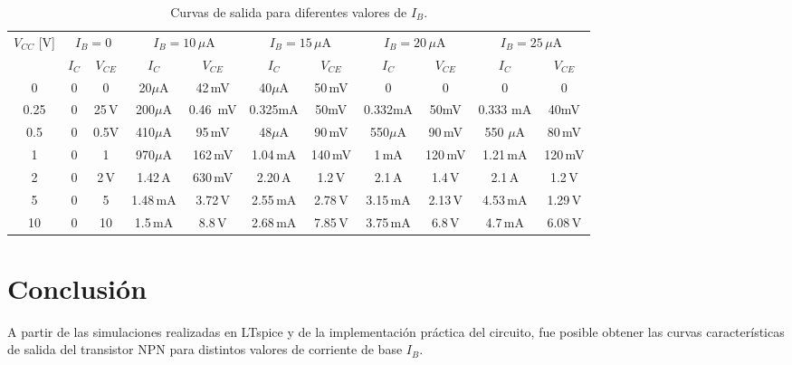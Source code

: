 \begin{table}[H]
\centering
\setlength{\tabcolsep}{6pt}
\renewcommand{\arraystretch}{1.2}
\begin{tabular}{|c|cc|cc|cc|cc|cc|}
\hline
$V_{CC}$ [V] & \multicolumn{2}{c|}{$I_B=0$} & \multicolumn{2}{c|}{$I_B=10\,\mu$A} & \multicolumn{2}{c|}{$I_B=15\,\mu$A} & \multicolumn{2}{c|}{$I_B=20\,\mu$A} & \multicolumn{2}{c|}{$I_B=25\,\mu$A} \\
\cline{2-11}
             & $I_C$ & $V_{CE}$ & $I_C$ & $V_{CE}$ & $I_C$ & $V_{CE}$ & $I_C$ & $V_{CE}$ & $I_C$ & $V_{CE}$ \\
\hline
0    & 0     &  0     & 20$\mu$A   & 42\,mV & 40$\mu$A & 50\,mV  & 0      &    0   & 0      &    0   \\

0.25 & 0     & 25\,V & 200$\mu$A & 0.46\ mV &    0.325mA    &    50mV     &     0.332mA   &   50mV    &      0.333 mA  & 40mV      \\

0.5  & 0      & 0.5V    & 410$\mu$A & 95\,mV   & 48$\mu$A & 90\,mV  & 550$\mu$A & 90\,mV &   550 $\mu$A     & 80\,mV \\

1    &  0     &    1   & 970$\mu$A & 162\,mV  & 1.04\,mA & 140\,mV   & 1\,mA  & 120\,mV  & 1.21\,mA & 120\,mV \\

2    & 0     & 2\,V   & 1.42\,A & 630\,mV  & 2.20\,A & 1.2\,V  & 2.1\,A  & 1.4\,V  & 2.1\,A  & 1.2\,V \\

5    &   0   & 5     & 1.48\,mA & 3.72\,V  & 2.55\,mA & 2.78\,V & 3.15\,mA & 2.13\,V & 4.53\,mA  & 1.29\,V \\

10   &  0    & 10    & 1.5\,mA & 8.8\,V  & 2.68\,mA & 7.85\,V & 3.75\,mA & 6.8\,V  & 4.7\,mA & 6.08\,V \\

\hline
\end{tabular}
\caption{Curvas de salida para diferentes valores de $I_B$.}
\end{table}

\section{Conclusión}

A partir de las simulaciones realizadas en LTspice y de la implementación práctica del circuito, fue posible obtener las curvas características de salida del transistor NPN para distintos valores de corriente de base $I_B$.

